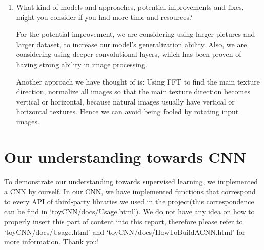 \documentclass[letter]{article}
\begin{document}
\begin{itemize}
\begin{enumerate}
\begin{itemize}
		\end{itemize}
		\item {What kind of models and approaches, potential improvements and fixes, might you consider if you had more
			time and resources?}
		\par{For the potential improvement, we are considering using larger pictures and larger dataset, to increase our model's generalization ability. Also, we are considering using deeper convolutional layers, which has been proven of having strong ability in image processing.}
		\par{Another approach we have thought of is:
			Using FFT to find the main texture direction, normalize all images so that the main texture direction becomes vertical or horizontal, because natural images usually have vertical or horizontal textures. Hence we can avoid being fooled by rotating input images.
		}
	\end{enumerate}
\end{itemize}

\section{Our understanding towards CNN}
\par{To demonstrate our understanding towards supervised learning, we implemented a CNN by ourself. In our CNN, we have implemented functions that correspond to every API of third-party libraries we used in the project(this correspondence can be find in `toyCNN/docs/Usage.html'). We do not have any idea on how to properly insert this part of content into this report, therefore please refer to `toyCNN/docs/Usage.html' and `toyCNN/docs/HowToBuildACNN.html' for more information. Thank you!}
\end{document}
